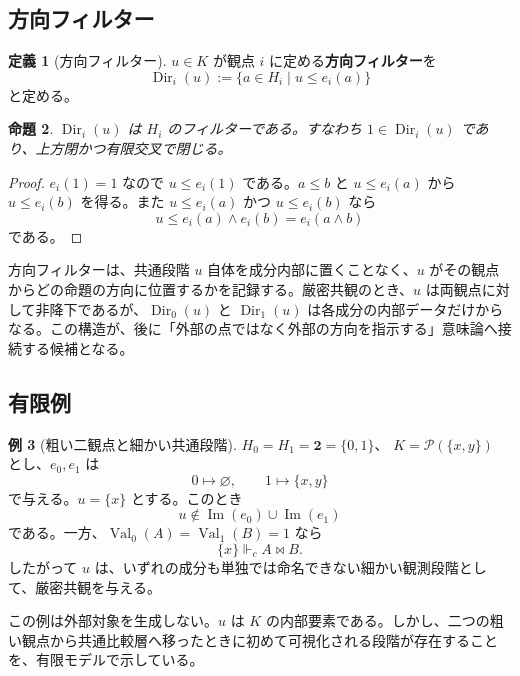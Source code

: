 \documentclass[a4paper,11pt]{ltjsarticle}
\theoremstyle{definition}
\newtheorem{definition}{定義}[section]
\newtheorem{example}[definition]{例}
\theoremstyle{plain}
\newtheorem{proposition}[definition]{命題}
\newcommand{\Val}{\operatorname{Val}}
\newcommand{\Img}{\operatorname{Im}}
\newcommand{\Dir}{\operatorname{Dir}}
\newcommand{\forcesc}{\Vdash_{\!c}}
\begin{document}
\subsection{方向フィルター}

\begin{definition}[方向フィルター]
$u\in K$ が観点 $i$ に定める\textbf{方向フィルター}を
\begin{equation}
 \Dir_i(u)
 :=\{a\in H_i\mid u\leq e_i(a)\}
 \label{eq:direction-filter}
\end{equation}
と定める。
\end{definition}

\begin{proposition}
$\Dir_i(u)$ は $H_i$ のフィルターである。すなわち $1\in\Dir_i(u)$ であり、上方閉かつ有限交叉で閉じる。
\end{proposition}

\begin{proof}
$e_i(1)=1$ なので $u\leq e_i(1)$ である。$a\leq b$ と $u\leq e_i(a)$ から $u\leq e_i(b)$ を得る。また $u\leq e_i(a)$ かつ $u\leq e_i(b)$ なら
\[
 u\leq e_i(a)\wedge e_i(b)=e_i(a\wedge b)
\]
である。
\end{proof}

方向フィルターは、共通段階 $u$ 自体を成分内部に置くことなく、$u$ がその観点からどの命題の方向に位置するかを記録する。厳密共観のとき、$u$ は両観点に対して非降下であるが、$\Dir_0(u)$ と $\Dir_1(u)$ は各成分の内部データだけからなる。この構造が、後に「外部の点ではなく外部の方向を指示する」意味論へ接続する候補となる。

\subsection{有限例}

\begin{example}[粗い二観点と細かい共通段階]
$H_0=H_1=\mathbf 2=\{0,1\}$、
$K=\mathcal P(\{x,y\})$ とし、$e_0,e_1$ は
\[
 0\longmapsto\varnothing,
 \qquad
 1\longmapsto\{x,y\}
\]
で与える。$u=\{x\}$ とする。このとき
\[
 u\notin\Img(e_0)\cup\Img(e_1)
\]
である。一方、$\Val_0(A)=\Val_1(B)=1$ なら
\[
 \{x\}\forcesc A\bowtie B.
\]
したがって $u$ は、いずれの成分も単独では命名できない細かい観測段階として、厳密共観を与える。
\end{example}

この例は外部対象を生成しない。$u$ は $K$ の内部要素である。しかし、二つの粗い観点から共通比較層へ移ったときに初めて可視化される段階が存在することを、有限モデルで示している。
\end{document}
